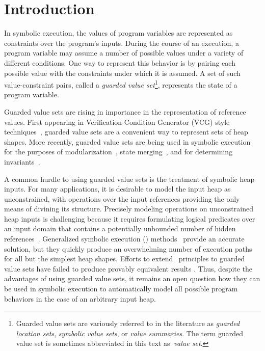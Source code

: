 \section{Introduction}




%

In symbolic execution, the values of program variables are represented
as constraints over the program's inputs. During the course of an
execution, a program variable may assume a number of possible values
under a variety of different conditions. One way to represent this
behavior is by pairing each possible value with the constraints under
which it is assumed. A set of such value-constraint pairs, called a
\emph{guarded value set}\footnote{Guarded value sets are variously
  referred to in the literature as \emph{guarded location sets},
  \emph{symbolic value sets}, or \emph{value summaries}. The term
  guarded value set is sometimes abbreviated in this text
  as~\emph{value set}.}, represents the state of a program variable.

Guarded value sets are rising in importance in the representation of
reference values. First appearing in Verification-Condition Generator
(VCG) style techniques~\cite{Xie:2005,Dillig:2011}, guarded value sets
are a convenient way to represent sets of heap shapes. More recently,
guarded value sets are being used in symbolic execution for the
purposes of modularization~\cite{Yorsh:2008}, state
merging~\cite{Sen:2014}, and for determining
invariants~\cite{Ferrara:2014,Torlak:2014}.

A common hurdle to using guarded value sets is the treatment of
symbolic heap inputs. For many applications, it is desirable to model
the input heap as unconstrained, with operations over the input
references providing the only means of divining its
structure. Precisely modeling operations on unconstrained heap inputs
is challenging because it requires formulating logical predicates over
an input domain that contains a potentially unbounded number of hidden
references~\cite{Chen:2013,Qu:2011}. Generalized symbolic execution
(\gsetxt{}) methods~\cite{GSE03,Deng:2007} provide an accurate
solution, but they quickly produce an overwhelming number of execution
paths for all but the simplest heap shapes. Efforts to
extend~\gsetxt{} principles to guarded value sets have failed to
produce provably equivalent results \cite{LISTEFFORTS}. Thus, despite
the advantages of using guarded value sets, it remains an open
question how they can be used in symbolic execution to automatically
model all possible program behaviors in the case of an arbitrary input
heap.

